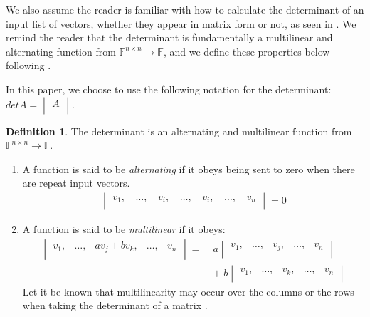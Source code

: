 \documentclass[11pt,reqno]{amsart}
\theoremstyle{definition}
\newtheorem{definition}[theorem]{Definition}
\begin{document}
We also assume the reader is familiar with how to calculate the determinant of an input list of vectors, whether they appear in matrix form or not, as seen in \cite[Chapter 5]{strang}. We remind the reader that the determinant is fundamentally a multilinear and alternating function from $\mathbb{F}^{n \times n} \rightarrow \mathbb{F}$, and we define these properties below following \cite[Theorem 6.9]{nomizu}.

In this paper, we choose to use the following notation for the determinant: $detA=\begin{vmatrix}
A\\
\end{vmatrix}$.

\begin{definition}
\label{def1}
The determinant is an alternating and multilinear function from $\mathbb{F}^{n \times n} \rightarrow \mathbb{F}$. 

\begin{enumerate}
  \item A function is said to be \textit{alternating} if it obeys being sent to zero when there are repeat input vectors.
  \begin{align*}
    \begin{vmatrix}
    v_1,\, &\dots,\, & v_i,\, & \dots,\, & v_i,\, &\dots,\, & v_n\\
    \end{vmatrix}
    = 0 
  \end{align*}
  \item A function is said to be \textit{multilinear} if it obeys:
  \begin{equation*}
  \begin{split}
  \begin{vmatrix}
       v_1, &\dots, & av_j + bv_k, &\dots, & v_n\\
  \end{vmatrix}
  = \;
    &a
  \begin{vmatrix}
       v_1, &\dots, & v_j, &\dots, & v_n\\
  \end{vmatrix} \\
  &+ \;
  b
  \begin{vmatrix}
       v_1, &\dots, & v_k, &\dots, & v_n\\
  \end{vmatrix}
  \end{split}
  \end{equation*}
  Let it be known that multilinearity may occur over the columns or the rows when taking the determinant of a matrix \cite{nomizu}.
  
\end{enumerate}

\end{definition}
\end{document}

